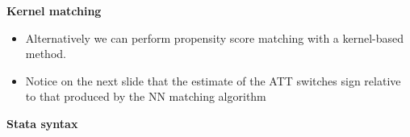 \documentclass[notes=show]{beamer}
\begin{document}
\begin{frame}[plain]
	\begin{center}
	\textbf{Kernel matching}
	\end{center}
	
	\begin{itemize}
	\item Alternatively we can perform propensity score matching with a kernel-based method. 
	\item Notice on the next slide that the estimate of the ATT switches sign relative to that produced by the NN matching algorithm
	\end{itemize}
\end{frame}


\begin{frame}[plain]
\begin{center}
\textbf{Stata syntax}
\end{center}

 
\end{frame}


\begin{frame}[plain]

	\begin{figure}
	\end{figure}


\end{frame}
\end{document}
